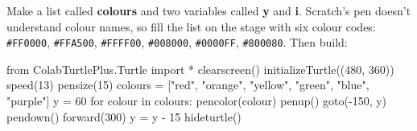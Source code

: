 \noindent\begin{minipage}[t]{0.61\linewidth}\vspace{0pt}
\begin{scratch}
\end{scratch}
\end{minipage}\hfill\begin{minipage}[t]{0.36\linewidth}\vspace{0pt}
Make a list called \textbf{colours} and two variables called \textbf{y} and \textbf{i}. Scratch's pen doesn't understand colour names, so fill the list on the stage with six colour codes: \texttt{\#FF0000}, \texttt{\#FFA500}, \texttt{\#FFFF00}, \texttt{\#008000}, \texttt{\#0000FF}, \texttt{\#800080}. Then build:
\end{minipage}



\begin{typethis}
from ColabTurtlePlus.Turtle import *
clearscreen()
initializeTurtle((480, 360))
speed(13)
pensize(15)
colours = ["red", "orange", "yellow",
           "green", "blue", "purple"]
y = 60
for colour in colours:
    pencolor(colour)
    penup()
    goto(-150, y)
    pendown()
    forward(300)
    y = y - 15
hideturtle()
\end{typethis}

\par{}\par\nopagebreak

